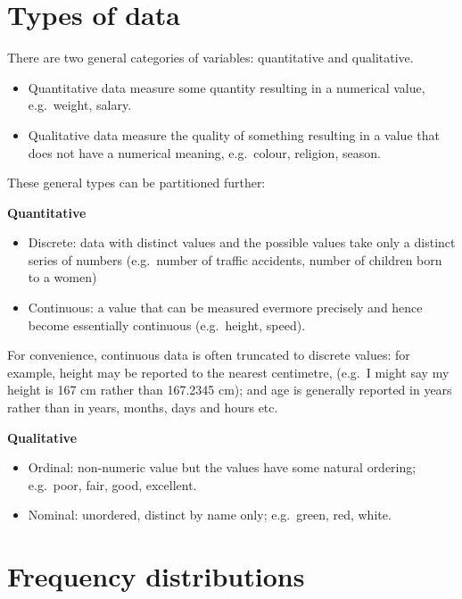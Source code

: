 \documentclass[
  oneside]{krantz}
\begin{document}
\hypertarget{types-of-data}{%
\section{Types of data}\label{types-of-data}}

There are two general categories of variables: quantitative and qualitative.

\begin{itemize}
\item
  Quantitative data measure some quantity resulting in a numerical value, e.g.~weight, salary.
\item
  Qualitative data measure the quality of something resulting in a value that does not have a numerical meaning, e.g.~colour, religion, season.
\end{itemize}

These general types can be partitioned further:

\textbf{Quantitative}

\begin{itemize}
\item
  Discrete: data with distinct values and the possible values take only a distinct series of numbers (e.g.~number of traffic accidents, number of children born to a women)
\item
  Continuous: a value that can be measured evermore precisely and hence become essentially continuous (e.g.~height, speed).
\end{itemize}

For convenience, continuous data is often truncated to discrete values: for example, height may be reported to the nearest centimetre, (e.g.~I might say my height is 167 cm rather than 167.2345 cm); and age is generally reported in years rather than in years, months, days and hours etc.

\textbf{Qualitative}

\begin{itemize}
\item
  Ordinal: non-numeric value but the values have some natural ordering; e.g.~poor, fair, good, excellent.
\item
  Nominal: unordered, distinct by name only; e.g.~green, red, white.
\end{itemize}

\hypertarget{frequency-distributions}{%
\section{Frequency distributions}\label{frequency-distributions}}
\end{document}

